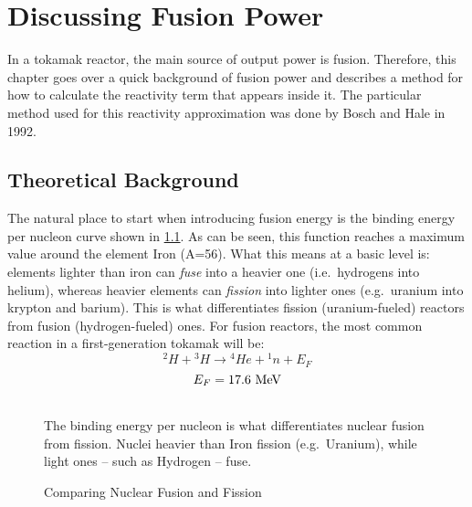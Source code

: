 \chapter{Discussing Fusion Power}

\label{chapter:power}

In a tokamak reactor, the main source of output power is fusion. Therefore, this chapter goes over a quick background of fusion power and describes a method for how to calculate the reactivity term that appears inside it. The particular method used for this reactivity approximation was done by Bosch and Hale in 1992.\cite{boschhale}

\section{Theoretical Background}

The natural place to start when introducing fusion energy is the binding energy per nucleon curve shown in \cref{fig:binding_energy}. As can be seen, this function reaches a maximum value around the element Iron (A=56). What this means at a basic level is: elements lighter than iron can \emph{fuse} into a heavier one (i.e.\ hydrogens into helium), whereas heavier elements can \emph{fission} into lighter ones (e.g.\ uranium into krypton and barium). This is what differentiates fission (uranium-fueled) reactors from fusion (hydrogen-fueled) ones. For fusion reactors, the most common reaction in a first-generation tokamak will be:
\begin{equation}
	{}^2H+ {}^3H \rightarrow {}^4 He + {}^1 n + E_F
\end{equation}
\begin{equation}
	E_F = 17.6 \ \textnormal{MeV}
\end{equation}

\begin{figure}
	\centering
	\begin{adjustbox}{width=0.75\textwidth}
		
	\end{adjustbox}
	\caption{Comparing Nuclear Fusion and Fission} ~\\
	\small The binding energy per nucleon is what differentiates nuclear fusion from fission. Nuclei heavier than Iron fission (e.g.\ Uranium), while light ones -- such as Hydrogen -- fuse.
	\label{fig:binding_energy}
\end{figure}

